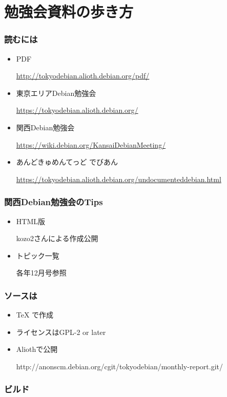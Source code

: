 \documentclass[cjk,dvipdfmx,10pt,compress,%
hyperref={bookmarks=true,bookmarksnumbered=true,bookmarksopen=false,%
colorlinks=false,%
pdftitle={第 107 回 関西 Debian 勉強会},%
pdfauthor={倉敷・のがた・佐々木・かわだ},%
pdfsubject={資料},%
}]{beamer}
\begin{document}

\section{勉強会資料の歩き方}

\begin{frame}
  \frametitle{ 読むには }
  \begin{itemize}
  \item PDF

    \url{http://tokyodebian.alioth.debian.org/pdf/}
  \item 東京エリアDebian勉強会

    \url{https://tokyodebian.alioth.debian.org/}
  \item 関西Debian勉強会

    \url{https://wiki.debian.org/KansaiDebianMeeting/}
  \item あんどきゅめんてっど でびあん

    \url{https://tokyodebian.alioth.debian.org/undocumenteddebian.html}
  \end{itemize}
\end{frame}

\begin{frame}
  \frametitle{ 関西Debian勉強会のTips }
  \begin{itemize}
  \item HTML版

    kozo2さんによる作成公開
  \item トピック一覧

    各年12月号参照
  \end{itemize}
\end{frame}

\begin{frame}
  \frametitle{ ソースは }
  \begin{itemize}
  \item TeX で作成
  \item ライセンスはGPL-2 or later
  \item Aliothで公開

    http://anonscm.debian.org/cgit/tokyodebian/monthly-report.git/
  \end{itemize}
\end{frame}

\begin{frame}[containsverbatim]
  \frametitle{ ビルド }
\end{frame}
\end{document}
